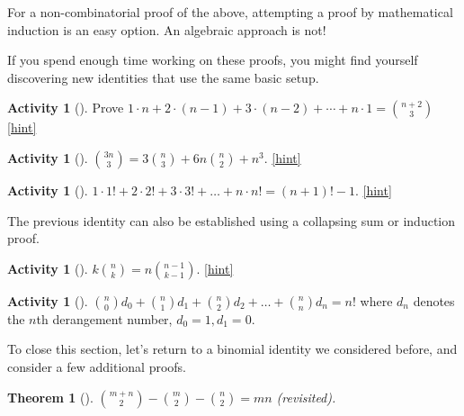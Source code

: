 \documentclass[10pt,]{book}
\theoremstyle{plain}
\newtheorem{theorem}{Theorem}[section]
\theoremstyle{definition}
\theoremstyle{definition}
\theoremstyle{definition}
\newtheorem{activity}[project]{Activity}
\numberwithin{equation}{chapter}
\begin{document}
\hypertarget{p-715}{}%
For a non-combinatorial proof of the above, attempting a proof by mathematical induction is an easy option. An algebraic approach is not!%
\par
\hypertarget{p-716}{}%
If you spend enough time working on these proofs, you might find yourself discovering new identities that use the same basic setup.%
\begin{activity}[]\label{activity-96}
\hypertarget{p-717}{}%
Prove \(1\cdot n + 2 \cdot (n-1) + 3 \cdot (n-2) + \cdots + n \cdot 1 = \binom{n+2}{3}\)%
\hfill{\tiny\hyperlink{a-103}{[hint]}\hypertarget{q-103}{}}\end{activity}
\begin{activity}[]\label{activity-97}
\hypertarget{p-721}{}%
\(\binom{3n}{3} = 3 \binom{n}{3} + 6n \binom{n}{2} + n^{3}\).%
\hfill{\tiny\hyperlink{a-104}{[hint]}\hypertarget{q-104}{}}\end{activity}
\begin{activity}[]\label{activity-98}
\hypertarget{p-724}{}%
\(1 \cdot 1! + 2 \cdot 2! + 3 \cdot 3! + \ldots + n \cdot n! = \left( n + 1 \right)! - 1\).%
\hfill{\tiny\hyperlink{a-105}{[hint]}\hypertarget{q-105}{}}\end{activity}
\hypertarget{p-727}{}%
The previous identity can also be established using a collapsing sum or induction proof.%
\begin{activity}[]\label{activity-99}
\hypertarget{p-728}{}%
\(k \binom{n}{k} = n \binom{n - 1}{k - 1}\).%
\hfill{\tiny\hyperlink{a-106}{[hint]}\hypertarget{q-106}{}}\end{activity}
\begin{activity}[]\label{activity-100}
\hypertarget{p-732}{}%
\(\binom{n}{0} d_{0} + \binom{n}{1} d_{1} + \binom{n}{2} d_{2} + \ldots + \binom{n}{n} d_{n} = n!\) where \(d_{n}\) denotes the \(n\)th derangement number, \(d_{0} = 1,d_{1} = 0\).%
\end{activity}
\hypertarget{p-734}{}%
To close this section, let's return to a binomial identity we considered before, and consider a few additional proofs.%
\begin{theorem}[{}]\label{theorem-11}
\hypertarget{p-735}{}%
\(\binom{m + n}{2} - \binom{m}{2} - \binom{n}{2} = mn\) (revisited).%
\end{theorem}
\end{document}
